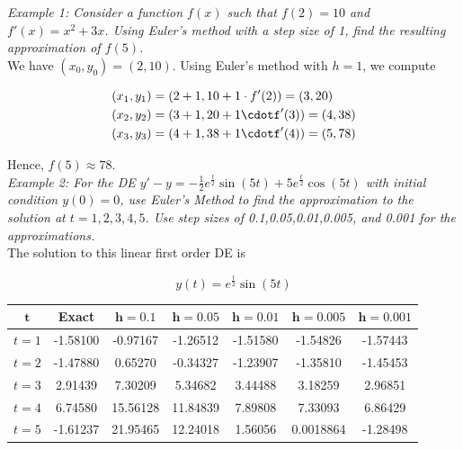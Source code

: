         \noindent \color{blue} \textit{Example 1: Consider a function $f(x)$ such that $f(2)=10$
        and $f'(x)=x^2+3x$. Using Euler's method with a step size of 1, find the resulting
        approximation of $f(5)$.} \color{black} \\

        \noindent We have $(x_0,y_0)=(2,10)$. Using Euler's method with $h=1$, we compute

        \begin{align*}
            (x_1,y_1) &= (2+1,10+1\cdot f'(2)) = (3,20) \\
            (x_2,y_2) &= (3+1,20+1\cdotf'(3)) = (4,38) \\
            (x_3,y_3) &= (4+1,38+1\cdotf'(4)) = (5,78)
        \end{align*}

        \noindent Hence, $f(5)\approx 78$. \\

        \noindent \color{blue} \textit{Example 2: For the DE $y'-y=-\frac{1}{2}e^{\frac{t}{2}}
        \sin{(5t)}+5e^{\frac{t}{2}}\cos{(5t)}$ with initial condition $y(0)=0$, use Euler's
        Method to find the approximation to the solution at $t=1,2,3,4,5$. Use step sizes of
        0.1,0.05,0.01,0.005, and 0.001 for the approximations. }\color{black} \\

        \noindent The solution to this linear first order DE is

        \begin{equation*}
            y(t)    = e^{\frac{t}{2}}\sin{(5t)}
        \end{equation*}

        \begin{center}
            \begin{tabular}{|c|c|c|c|c|c|c|}
                \hline
                $\bm{t}$ & \textbf{Exact} & $\bm{h=0.1}$ & $\bm{h=0.05}$ & $\bm{h=0.01}$
                & $\bm{h=0.005}$ & $\bm{h=0.001}$ \\
                \hline
                $t=1$ & -1.58100 & -0.97167 & -1.26512 & -1.51580 & -1.54826 & -1.57443 \\
                \hline
                $t=2$ & -1.47880 & 0.65270 & -0.34327 & -1.23907 & -1.35810 & -1.45453 \\
                \hline
                $t=3$ & 2.91439 & 7.30209 & 5.34682 & 3.44488 & 3.18259 & 2.96851 \\
                \hline
                $t=4$ & 6.74580 & 15.56128 & 11.84839 & 7.89808 & 7.33093 & 6.86429 \\
                \hline
                $t=5$ & -1.61237 & 21.95465 & 12.24018 & 1.56056 & 0.0018864 & -1.28498 \\
                \hline
            \end{tabular}
        \end{center}

